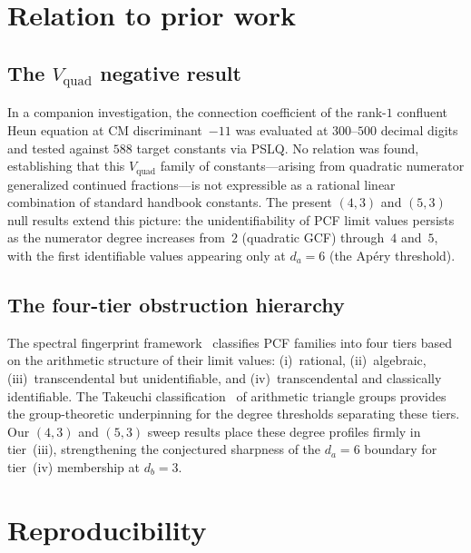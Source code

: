 \documentclass[11pt]{amsart}
\theoremstyle{plain}
\theoremstyle{remark}
\begin{document}
\section{Relation to prior work}\label{sec:prior}

\subsection{The $V_{\mathrm{quad}}$ negative result}
In a companion investigation, the connection coefficient
of the rank-$1$ confluent Heun equation at CM discriminant~$-11$
was evaluated at $300$--$500$ decimal digits and tested against
$588$ target constants via PSLQ.
No relation was found, establishing that this
$V_{\mathrm{quad}}$ family of constants---arising from quadratic
numerator generalized continued fractions---is not expressible as a
rational linear combination of standard handbook constants.
The present $(4,3)$ and $(5,3)$ null results extend this picture:
the unidentifiability of PCF limit values persists as the numerator
degree increases from~$2$ (quadratic GCF) through~$4$ and~$5$,
with the first identifiable values appearing only at $d_a = 6$
(the Ap\'ery threshold).

\subsection{The four-tier obstruction hierarchy}
The spectral fingerprint framework~\cite{spectral} classifies PCF
families into four tiers based on the arithmetic structure of
their limit values:
(i)~rational,
(ii)~algebraic,
(iii)~transcendental but unidentifiable,
and (iv)~transcendental and classically identifiable.
The Takeuchi classification~\cite{takeuchi1977} of arithmetic
triangle groups provides the group-theoretic underpinning for
the degree thresholds separating these tiers.
Our $(4,3)$ and $(5,3)$ sweep results place these degree
profiles firmly in tier~(iii), strengthening the conjectured
sharpness of the $d_a = 6$ boundary for tier~(iv) membership
at $d_b = 3$.

\section{Reproducibility}\label{sec:repro}
\end{document}
